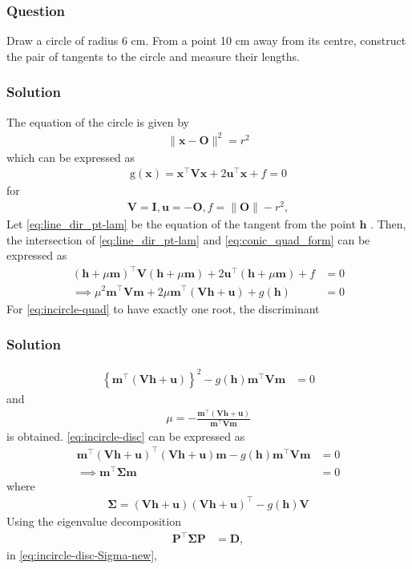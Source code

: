 \documentclass{beamer}
\providecommand{\brak}[1]{\ensuremath{\left(#1\right)}}
\providecommand{\cbrak}[1]{\ensuremath{\left\{#1\right\}}}
\theoremstyle{remark}
\providecommand{\norm}[1]{\lVert#1\rVert}
\let\vec\mathbf
\begin{document}
\begin{frame}
\frametitle{Question}
Draw a circle of radius 6 cm. From a point 10 cm away from its centre, construct the pair of tangents to the circle and measure their lengths.
\end{frame}
\begin{frame}
\frametitle{Solution}
	The equation of the circle is given by 
		\begin{align}
			\label{eq:incircle}
			\norm{\vec{x}-\vec{O}}^2 = r^2
		\end{align}
		which can be expressed as 
\begin{align}
    \label{eq:conic_quad_form}
	\text{g}\brak{\vec{x}} = \vec{x}^{\top}\vec{V}\vec{x}+2\vec{u}^{\top}\vec{x}+f=0
    \end{align}
for
		\begin{align}
			 \label{eq:conic_quad_form-params}
	 \vec{V}=\vec{I},\vec{u}=-\vec{O}, f = \norm{\vec{O}}-r^2,
		\end{align}
Let 
  \eqref{eq:line_dir_pt-lam}
  be the equation of the tangent from the point $\vec{h}$ .  Then, the intersection of 
  \eqref{eq:line_dir_pt-lam}
  and 
			 \eqref{eq:conic_quad_form}
			 can be expressed as 
\begin{align}
\brak{\vec{h} + \mu{\vec{m}}}^{\top}
\vec{V}
\brak{\vec{h} + \mu{\vec{m}}}
			+2\vec{u}^{\top}\brak{\vec{h} + \mu{\vec{m}}}+f &= 0
			\\
\implies \mu^2\vec{m}^{\top} \vec{V}\vec{m} + 2\mu \vec{m}^{\top}\brak{\vec{V}\vec{h}+\vec{u}}+g\brak{\vec{h}} &= 0 
	\label{eq:incircle-quad}
\end{align}
For 	\eqref{eq:incircle-quad} to have exactly one root, the discriminant
\end{frame}
\begin{frame}
\frametitle{Solution}
\begin{align}
 \cbrak{\vec{m}^{\top}\brak{\vec{V}\vec{h}+\vec{u}}}^2 -g\brak{\vec{h}}\vec{m}^{\top} \vec{V}\vec{m}  &= 0 
	\label{eq:incircle-disc}
\end{align}
and 
  \begin{align}
  \label{eq:line_dir_pt-lam-mu}
	  \mu = -\frac{\vec{m}^{\top}\brak{\vec{V}\vec{h}+\vec{u}}}{\vec{m}^{\top}\vec{V}\vec{m} }
  \end{align}
  is obtained.
	\eqref{eq:incircle-disc}
	can be expressed as
\begin{align}
\vec{m}^{\top}\brak{\vec{V}\vec{h}+\vec{u}}^{\top}\brak{\vec{V}\vec{h}+\vec{u}}\vec{m}-g\brak{\vec{h}}\vec{m}^{\top} \vec{V}\vec{m}  &= 0 
\\
\implies \vec{m}^{\top}\vec{\Sigma}\vec{m} &= 0
	\label{eq:incircle-disc-Sigma-new}
\end{align}
where
\begin{align}
	\label{eq:incircle-disc-Sigma}
\vec{\Sigma} = 
\brak{\vec{V}\vec{h}+\vec{u}}
	  \brak{\vec{V}\vec{h}+\vec{u}}^{\top}
   -
	  {g}\brak{\vec{h}}\vec{V}
\end{align}
Using the eigenvalue decomposition
    \begin{align}
      \label{eq:conic_parmas_eig_def}
      \vec{P}^{\top}\vec{\Sigma}\vec{P} &= \vec{D},
    \end{align} 
	in \eqref{eq:incircle-disc-Sigma-new},
\end{frame}
\end{document}

